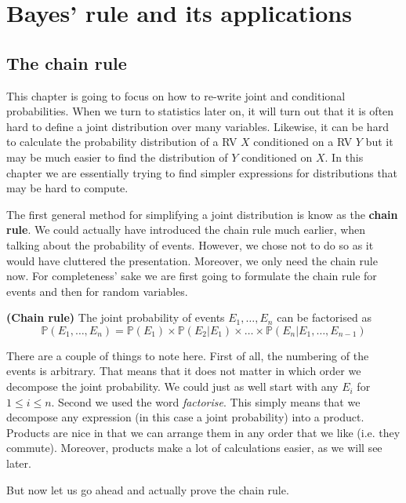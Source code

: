 
\setcounter{chapter}{3}
\chapter{Bayes' rule and its applications}

\section{The chain rule}

This chapter is going to focus on how to re-write joint and conditional probabilities. When we turn to statistics later on, it will
turn out that it is often hard to define a joint distribution over many variables. Likewise, it can be hard to calculate 
the probability distribution of a RV $ X $ conditioned on a RV $ Y $ but it may be much easier to find the distribution of $ Y $
conditioned on $ X $. In this chapter we are essentially trying to find simpler expressions for distributions that may be hard to
compute.

The first general method for simplifying a joint distribution is know as the \textbf{chain rule}. We could actually have introduced
the chain rule much earlier, when talking about the probability of events. However, we chose not to do so as it would have 
cluttered the presentation. Moreover, we only need the chain rule now. For completeness' sake we are first going to formulate
the chain rule for events and then for random variables.

\begin{Theorem}{\textbf{(Chain rule)}} \label{thm:chain}
The joint probability of events $ E_{1}, \ldots, E_{n} $ can be factorised as
$$ \mathbb{P}(E_{1}, \ldots, E_{n}) = \mathbb{P}(E_{1}) \times \mathbb{P}(E_{2}|E_{1}) \times \ldots \times \mathbb{P}(E_{n}|E_{1}, \ldots, E_{n-1}) $$
\end{Theorem} 

There are a couple of things to note here. First of all, the numbering of the events is arbitrary. That means that it does not matter in which
order we decompose the joint probability. We could just as well start with any $ E_{i} $ for $ 1 \leq i \leq n $. Second we used the 
word \textit{factorise}. This simply means that we decompose any expression (in this case a joint probability) into a product. Products are
nice in that we can arrange them in any order that we like (i.e. they commute). Moreover, products make a lot of calculations easier, as we will
see later.

But now let us go ahead and actually prove the chain rule. 
